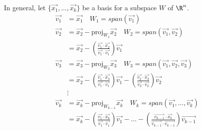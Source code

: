 \documentclass{math}
\begin{document}
In general, let \( \{\vec{x_1},\dots,\vec{x_k}\} \) be a basis for a subspace
\( W \) of \( \R^n \).
\begin{align*}
  \vec{v_1} &= \vec{x_1} \quad W_1 = span(\vec{v_1}) \\
  \vec{v_2} &= \vec{x_2}-\text{proj}_{W_1}\vec{x_2} \quad
    W_2 = span(\vec{v_1},\vec{v_2}) \\
  &= \vec{x_2}-
    \left(\frac{\vec{v_1}\cdot\vec{x_2}}{\vec{v_1}\cdot\vec{v_1}}\right)
    \vec{v_1} \\
  \vec{v_3} &= \vec{x_3}-\text{proj}_{W_2}\vec{x_3} \quad
    W_3 = span(\vec{v_1},\vec{v_2},\vec{v_3}) \\
  &= \vec{x_2}-
    \left(\frac{\vec{v_1}\cdot\vec{x_3}}{\vec{v_1}\cdot\vec{v_1}}\right)
    \vec{v_1}-
    \left(\frac{\vec{v_2}\cdot\vec{x_3}}{\vec{v_2}\cdot\vec{v_2}}\right)
    \vec{v_2} \\
  &\vdots \\
  \vec{v_k} &= \vec{x_k}-\text{proj}_{W_{k-1}}\vec{x_k} \quad
    W_k = span(\vec{v_1},\dots,\vec{v_k}) \\
  &= \vec{x_k}-
    \left(\frac{\vec{v_1}\cdot\vec{x_k}}{\vec{v_1}\cdot\vec{v_1}}\right)
    \vec{v_1}-\dots-
    \left(\frac{\vec{v_{k-1}}\cdot\vec{x_k}}{\vec{v_{k-1}}\cdot\vec{v_{k-1}}}
    \right)\vec{v_{k-1}} \\
\end{align*}
\end{document}
